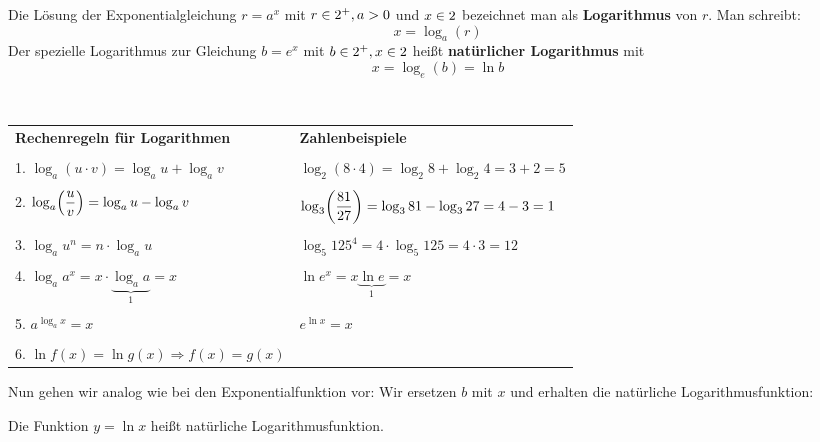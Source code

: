 \documentclass[ngerman, 12pt]{nssheetxea}
\begin{document}
\begin{definition}
Die Lösung der Exponentialgleichung $r=a^x$ mit $r\in 2^+, a>0$ und $x\in 2$ bezeichnet man als \textbf{Logarithmus} von $r$. Man schreibt:
\[ x=\log_a(r)  \]
Der spezielle Logarithmus zur Gleichung $b=e^x$ mit $b \in 2^+, x\in 2$ heißt \textbf{natürlicher Logarithmus} mit 
\[ x= \log_e(b) = \ln b \]
\label{Def:Logarithmus}
 
\end{definition}

\begin{theorem} \ \par

\begin{tabularx}{\textwidth}{X X}
\setstretch{2}
\textbf{Rechenregeln für Logarithmen} & \textbf{Zahlenbeispiele} \\
\\
1.   $\log_a (u\cdot v) = \log_a u + \log_a v$ & $\log_2 (8\cdot 4) = \log_2 8 + \log_2 4 = 3+2=5$ \\
\\
2.   $\log_a\mleft( \dfrac{u}{v} \mright) = \log_a u - \log_a v$ & $\log_3\mleft( \dfrac{81}{27} \mright) = \log_3 81 - \log_3 27=4-3=1$ \\
\\
3.   $\log_a u^n = n \cdot \log_a u$ & $\log_5 125^4 = 4 \cdot \log_5 125=4\cdot 3 = 12$ \\
\\
4.   $\log_a a^x = x \cdot \underbrace{\log_a a}_1 = x$ & $\ln e^x = x \underbrace{\ln e}_1 = x$ \\
\\
5.   $a^{\log_a x} = x$ & $e^{\ln x} = x$ \\
\\
6.   $\ln f(x) = \ln g(x) \Rightarrow f(x) = g(x)$ 

\end{tabularx}
\end{theorem}

Nun gehen wir analog wie bei den Exponentialfunktion vor: Wir ersetzen $b$ mit $x$ und erhalten die natürliche Logarithmusfunktion:

\begin{definition}

Die Funktion $y=\ln x$ heißt natürliche Logarithmusfunktion.  

\end{definition}
\end{document}
